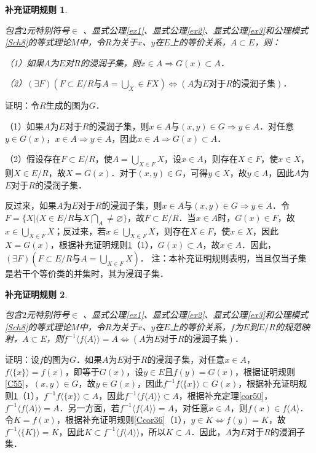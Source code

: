 \documentclass[12pt, a4paper, oneside]{book}
\newtheorem{Ccor}{补充证明规则}
\begin{document}
			\begin{Ccor}\label{Ccor41}
				\hfill\par
				包含$2$元特别符号$\in$ 、显式公理\ref{ex1}、显式公理\ref{ex2}、显式公理\ref{ex3}和公理模式\ref{Sch8}的等式理论$M$中，令$R$为关于$x$、$y$在$E$上的等价关系，$A\subset E$，则：
				\par
				（1）如果$A$为$E$对$R$的浸润子集，则$x\in A\Rightarrow G(x)\subset A$．
				\par
				（2）$(\exists F)(F\subset E/R\text{与}A=\bigcup\limits_X\in FX)\Leftrightarrow (A\text{为}E\text{对于}R\text{的浸润子集})$．
			\end{Ccor}
			证明：令$R$生成的图为$G$．
			\par
			（1）如果$A$为$E$对于$R$的浸润子集，则$x\in A\text{与}(x, y)\in G\Rightarrow y\in A$．对任意$y\in G(x)$，$x\in A \Rightarrow y\in A$，因此$x\in A\Rightarrow G(x)\subset A$．
			\par
			（2）假设存在$F\subset E/R$，使$A=\bigcup\limits_{X\in F}X$，设$x\in A$，则存在$X\in F$，使$x\in X$，则$X\in E/R$，故$X=G(x)$．对于$(x, y)\in G$，可得$y\in X$，故$y\in A$，因此$A$为$E$对于$R$的浸润子集．
			\par
			反过来，如果$A$为$E$对于$R$的浸润子集，则$x\in A\text{与}(x, y)\in G\Rightarrow y\in A$．令$F=\{X|(X\in E/R\text{与}X\bigcap\limits_A\neq \varnothing\}$，故$F\subset E/R$．当$x\in A$时，$G(x)\in F$，故$x\in \bigcup\limits_{X\in F}X$；反过来，若$x\in \bigcup\limits_{X\in F}X$，则存在$X\in F$，使$x\in X$，因此$X=G(x)$，根据补充证明规则\ref{Ccor41}（1），$G(x)\subset A$，故$x\in A$．因此，$(\exists F)(F\subset E/R\text{与}A=\bigcup\limits_{X\in F}X)$．
			注：本补充证明规则表明，当且仅当子集是若干个等价类的并集时，其为浸润子集．
			
			\begin{Ccor}\label{Ccor42}
				\hfill\par
				包含$2$元特别符号$\in$ 、显式公理\ref{ex1}、显式公理\ref{ex2}、显式公理\ref{ex3}和公理模式\ref{Sch8}的等式理论$M$中，令$R$为关于$x$、$y$在$E$上的等价关系，$f$为$E$到$E/R$的规范映射，$A\subset E$，则$f^{-1}\langle f\langle A \rangle \rangle =A\Leftrightarrow (A\text{为}E\text{对于}R\text{的浸润子集})$．
			\end{Ccor}
			证明：设$f$的图为$G$．如果$A$为$E$对于$R$的浸润子集，对任意$x\in A$，$f\langle \{x\} \rangle =f(x)$，即等于$G(x)$，设$y\in E$且$f(y)=G(x)$，根据证明规则\ref{C55}，$(x, y)\in G$，故$y\in G(x)$，因此$f^{-1}f\langle \{x\} \rangle \subset G(x)$，根据补充证明规则\ref{Ccor41}（1），$f^{-1}f\langle \{x\} \rangle \subset A$，因此$f^{-1}\langle f\langle A \rangle \rangle\subset A$，根据补充定理\ref{cor50}，$f^{-1}\langle f\langle A \rangle \rangle=A$．另一方面，若$f^{-1}\langle f\langle A \rangle \rangle=A$，对任意$x\in A$，则$f(x)\in f\langle A \rangle $．令$K=f(x)$，根据补充证明规则\ref{Ccor36}（1），$y\in K\Leftrightarrow f(y)=K$，故$f^{-1}\langle\{K\}\rangle=K$，因此$K\subset f^{-1}\langle f\langle A \rangle \rangle$，所以$K\subset A$．因此，$A$为$E$对于$R$的浸润子集．
			
\end{document}
